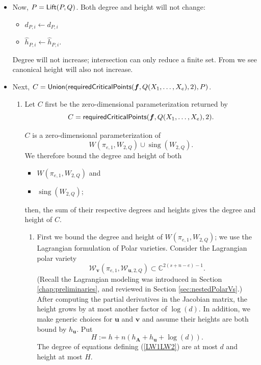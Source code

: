 \documentclass[12pt]{article}
\DeclareMathOperator{\sing}{sing}
\def\C{\mathbb{C}}
\def\Lift{{\sf Lift}}
\def\requiredCriticalPointsL{{\sf requiredCriticalPoints}}
\def\Union{{\sf Union}}
\def\C{\mathbb{C}}
\begin{document}
\begin{itemize}
    \item Now, $P = \Lift(P, Q)$. Both degree and height will not change:
\begin{itemize}
    \item $d_{P,i} \gets d_{P,i}$
    \item $\hat{h}_{P,i} \gets \hat{h}_{P,i}$.
\end{itemize}
Degree will not increase; intersection can only reduce a finite set. From \cite[Proposition 2.64]{EN} we see canonical height will also not increase.


    \item 
Next, $C = \Union(\requiredCriticalPointsL(\bm f,Q(X_1,\hdots,X_e),2),P)$. 
\newline 

\begin{enumerate}
    \item 

Let $C$ first be the zero-dimensional parameterization returned by 
\[
C = \requiredCriticalPointsL(\bm f,Q(X_1,\hdots,X_e),2).
\]


$C$ is a zero-dimensional parameterization of 
\[
W(\pi_{e,1},W_{2,Q}) \cup \sing(W_{2,Q}).
\]
We therefore bound the degree and height of both 
\begin{itemize}
    \item $W(\pi_{e,1},W_{2,Q})$ and 
    \item $\sing(W_{2,Q})$;
\end{itemize}
then, the sum of their respective degrees and heights gives the 
degree and height of $C$.
\begin{enumerate}
    \item First we bound the degree and height of  $W(\pi_{e,1},W_{2,Q})$; we use the Lagrangian formulation of Polar varieties. Consider the Lagrangian polar variety
\begin{equation}\label{LW1LW2}
%
\mathscr{W}_{\bm v}(\pi_{e,1},\mathscr{W}_{\bm u,2,Q}) \subset \C^{2(s+n-e)-1}.
\end{equation}
(Recall the Lagrangian modeling was introduced in Section \ref{chap:preliminaries}, and reviewed in Section \ref{sec:nestedPolarVs}.) 
%
After computing the partial derivatives in the Jacobian matrix, the height grows by at
most another factor of $\log (d)$. In addition, we make generic choices for $\bm u$ and $\bm v$ and assume their heights are both bound by $h_{\bm u}$. Put 
\[
H := h + n(h_{\bm A} + h_{\bm u}  + \log(d)). 
\]
The degree of equations defining (\ref{LW1LW2}) are at most $d$ and height at most $H$.


\end{enumerate}
\end{enumerate}
\end{itemize}
\end{document}
